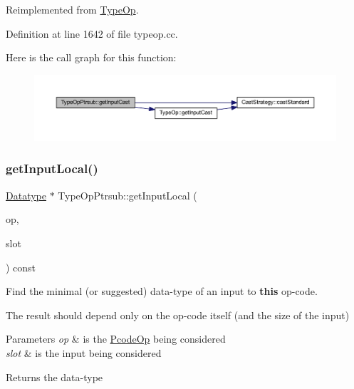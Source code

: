 Reimplemented from \mbox{\hyperlink{class_type_op_a950c417e4af100d176a701af5816b5ab}{Type\+Op}}.



Definition at line 1642 of file typeop.\+cc.

Here is the call graph for this function\+:
\nopagebreak
\begin{figure}[H]
\begin{center}
\leavevmode
\includegraphics[width=350pt]{class_type_op_ptrsub_a3c651a295323c8fbb431f26aa07b92f9_cgraph}
\end{center}
\end{figure}
\mbox{\label{class_type_op_ptrsub_aeb893948a1260af75942c71c4a2e19cd}} 
\subsubsection{\texorpdfstring{getInputLocal()}{getInputLocal()}}
{\footnotesize\ttfamily \mbox{\hyperlink{class_datatype}{Datatype}} $\ast$ Type\+Op\+Ptrsub\+::get\+Input\+Local (\begin{DoxyParamCaption}\item[{const \mbox{\hyperlink{class_pcode_op}{Pcode\+Op}} $\ast$}]{op,  }\item[{int4}]{slot }\end{DoxyParamCaption}) const\hspace{0.3cm}{\ttfamily [virtual]}}



Find the minimal (or suggested) data-\/type of an input to {\bfseries{this}} op-\/code. 

The result should depend only on the op-\/code itself (and the size of the input) 
\begin{DoxyParams}{Parameters}
{\em op} & is the \mbox{\hyperlink{class_pcode_op}{Pcode\+Op}} being considered \\
\hline
{\em slot} & is the input being considered \\
\hline
\end{DoxyParams}
\begin{DoxyReturn}{Returns}
the data-\/type 
\end{DoxyReturn}


